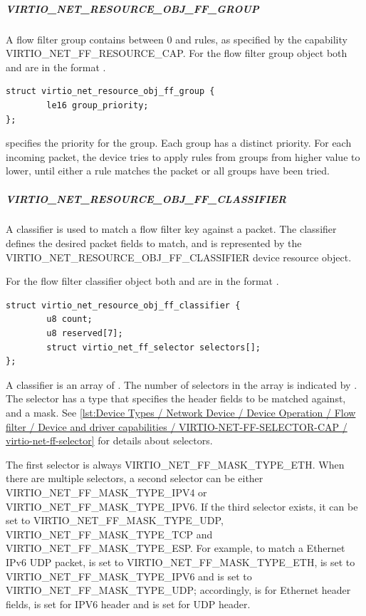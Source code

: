 \subparagraph{VIRTIO_NET_RESOURCE_OBJ_FF_GROUP}\label{par:Device Types / Network Device / Device Operation / Flow filter / Resource objects / VIRTIO-NET-RESOURCE-OBJ-FF-GROUP}

A flow filter group contains between 0 and  rules, as specified by the
capability VIRTIO_NET_FF_RESOURCE_CAP. For the flow filter group object both
 and
 are in the format
.

\begin{lstlisting}
struct virtio_net_resource_obj_ff_group {
        le16 group_priority;
};
\end{lstlisting}

 specifies the priority for the group. Each group has a
distinct priority. For each incoming packet, the device tries to apply rules
from groups from higher  value to lower, until either a
rule matches the packet or all groups have been tried.

\subparagraph{VIRTIO_NET_RESOURCE_OBJ_FF_CLASSIFIER}\label{par:Device Types / Network Device / Device Operation / Flow filter / Resource objects / VIRTIO-NET-RESOURCE-OBJ-FF-CLASSIFIER}

A classifier is used to match a flow filter key against a packet. The
classifier defines the desired packet fields to match, and is represented by
the VIRTIO_NET_RESOURCE_OBJ_FF_CLASSIFIER device resource object.

For the flow filter classifier object both  and
 are in the format
.

\begin{lstlisting}
struct virtio_net_resource_obj_ff_classifier {
        u8 count;
        u8 reserved[7];
        struct virtio_net_ff_selector selectors[];
};
\end{lstlisting}

A classifier is an array of . The number of selectors in the
array is indicated by . The selector has a type that specifies
the header fields to be matched against, and a mask.
See \ref{lst:Device Types / Network Device / Device Operation / Flow filter / Device and driver capabilities / VIRTIO-NET-FF-SELECTOR-CAP / virtio-net-ff-selector}
for details about selectors.

The first selector is always VIRTIO_NET_FF_MASK_TYPE_ETH. When there are multiple
selectors, a second selector can be either VIRTIO_NET_FF_MASK_TYPE_IPV4
or VIRTIO_NET_FF_MASK_TYPE_IPV6. If the third selector exists, it can be set to
VIRTIO_NET_FF_MASK_TYPE_UDP, VIRTIO_NET_FF_MASK_TYPE_TCP and VIRTIO_NET_FF_MASK_TYPE_ESP.
For example, to match a Ethernet IPv6 UDP packet,
 is set to VIRTIO_NET_FF_MASK_TYPE_ETH, 
is set to VIRTIO_NET_FF_MASK_TYPE_IPV6 and  is
set to VIRTIO_NET_FF_MASK_TYPE_UDP; accordingly,  is
for Ethernet header fields,  is set for IPV6 header
and  is set for UDP header.

